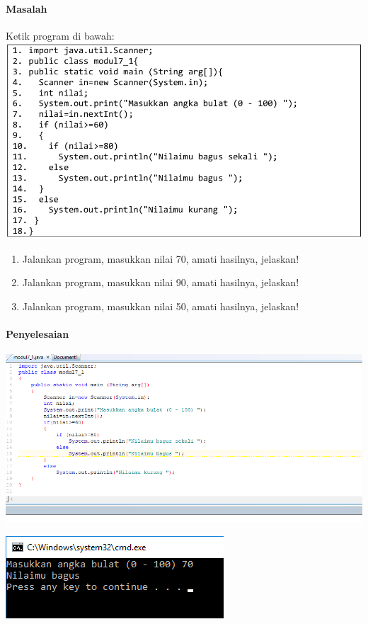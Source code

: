 \documentclass[a4paper,12pt]{article}
\begin{document}
\paragraph{Masalah\\}
Ketik program di bawah:\\
\includegraphics[width=\linewidth]{code1}\\
\begin{enumerate}[label=\alph*.]
	\item Jalankan program, masukkan nilai 70, amati hasilnya, jelaskan!
	\item Jalankan program, masukkan nilai 90, amati hasilnya, jelaskan!
	\item Jalankan program, masukkan nilai 50, amati hasilnya, jelaskan!
\end{enumerate}
\paragraph{Penyelesaian\\}
\includegraphics[width=\linewidth]{image--000}

\includegraphics[scale=0.6]{image--001}
\end{document}
